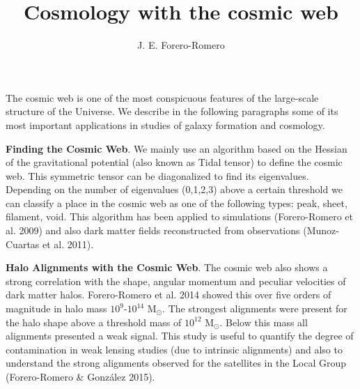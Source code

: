 \documentclass[preprint,proceedings]{rmaa}
\title{Cosmology with the cosmic web}
\author{J. E. Forero-Romero\altaffilmark{1}}
\begin{document}
\maketitle 



The cosmic web is one of the most conspicuous features of the
large-scale structure of the Universe. 
We describe in the following paragraphs some of its most important
applications in studies of galaxy formation and cosmology.

{\bf Finding the Cosmic Web}. We mainly use an algorithm based on the Hessian
of the gravitational potential (also known as Tidal tensor) to define the cosmic web. 
This symmetric tensor can be diagonalized to find its eigenvalues. 
Depending on the number of eigenvalues (0,1,2,3) above a certain threshold we
can classify a place in the cosmic web as one of the following types:
peak, sheet, filament, void. This algorithm has been applied to
simulations (Forero-Romero et al. 2009) and also dark matter fields
reconstructed from observations (Munoz-Cuartas et al. 2011). 


{\bf Halo Alignments with the Cosmic Web}.
The cosmic web also shows a strong correlation with the shape, angular
momentum and peculiar velocities of dark matter halos. Forero-Romero
et al. 2014 showed this over five orders of magnitude in halo mass
$10^9$-$10^{14}$ M$_{\odot}$. The strongest alignments were present
for the halo shape above a threshold mass of $10^{12}$
M$_{\odot}$. Below this mass all alignments presented a weak signal. 
This study is useful to quantify the degree of contamination in
weak lensing studies (due to intrinsic alignments) and also to
understand the strong alignments observed for the satellites in the
Local Group (Forero-Romero \& Gonz\'alez 2015). 
\end{document}
